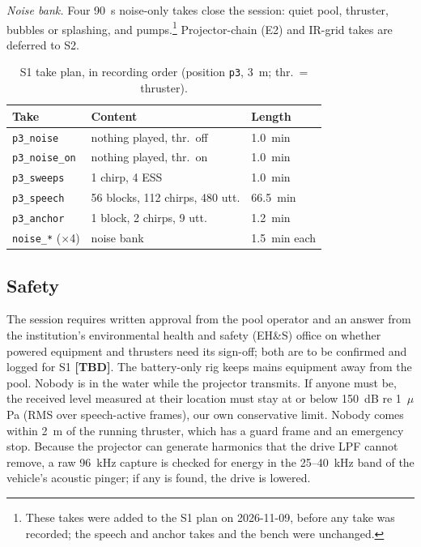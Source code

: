 \documentclass[conference]{IEEEtran}
\newcommand{\tbd}{\textbf{[TBD]}}
\begin{document}
\textit{Noise bank.} Four 90~s noise-only takes close the session: quiet pool, thruster,
bubbles or splashing, and pumps.\footnote{These takes were added to the S1 plan on 2026-11-09, before
any take was recorded; the speech and anchor takes and the bench were unchanged.} Projector-chain (E2)
and IR-grid takes are deferred to S2.

\begin{table}[t]
\caption{S1 take plan, in recording order (position \texttt{p3}, 3~m; thr.\ = thruster).}
\label{tab:takes}
\centering
\small
\setlength{\tabcolsep}{3.5pt}
\begin{tabular}{lll}
\hline
Take & Content & Length \\
\hline
\texttt{p3\_noise} & nothing played, thr.\ off & 1.0~min \\
\texttt{p3\_noise\_on} & nothing played, thr.\ on & 1.0~min \\
\texttt{p3\_sweeps} & 1 chirp, 4 ESS & 1.0~min \\
\texttt{p3\_speech} & 56 blocks, 112 chirps, 480 utt. & 66.5~min \\
\texttt{p3\_anchor} & 1 block, 2 chirps, 9 utt. & 1.2~min \\
\texttt{noise\_*} ($\times$4) & noise bank & 1.5~min each \\
\hline
\end{tabular}
\end{table}

\subsection{Safety}
\label{sec:safety}
The session requires written approval from the pool operator and an answer from the institution's
environmental health and safety (EH\&S) office on whether powered equipment and thrusters need its
sign-off; both are to be confirmed and logged for S1 \tbd. The battery-only rig keeps mains equipment
away from the pool. Nobody is in the water while the projector transmits. If anyone must
be, the received level measured at their location must stay at or below 150~dB re 1~$\mu$Pa (RMS over
speech-active frames), our own conservative limit. Nobody comes within 2~m of the running thruster,
which has a guard frame and an emergency stop. Because the projector can generate harmonics that the
drive LPF cannot remove, a raw 96~kHz capture is checked for energy in the 25--40~kHz band of the
vehicle's acoustic pinger; if any is found, the drive is lowered.
\end{document}
